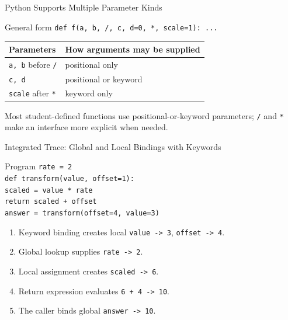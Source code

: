 \documentclass[aspectratio=169,10pt]{beamer}
\begin{document}
\begin{frame}{Python Supports Multiple Parameter Kinds}
  \begin{block}{General form}
    \centering
    \texttt{def f(a, b, /, c, d=0, *, scale=1): ...}
  \end{block}

  \begin{center}
    \renewcommand{\arraystretch}{1.25}
    \begin{tabular}{l|l}
      \textbf{Parameters} & \textbf{How arguments may be supplied} \\\hline
      \texttt{a, b} before \texttt{/} & positional only \\
      \texttt{c, d} & positional or keyword \\
      \texttt{scale} after \texttt{*} & keyword only
    \end{tabular}
  \end{center}

  \begin{keyidea}
    Most student-defined functions use positional-or-keyword parameters; \texttt{/} and \texttt{*} make an interface more explicit when needed.
  \end{keyidea}
\end{frame}


\begin{frame}{Integrated Trace: Global and Local Bindings with Keywords}
  \begin{block}{Program}
    \texttt{rate = 2}\\
    \texttt{def transform(value, offset=1):}\\
    \hspace*{0.20in}\texttt{scaled = value * rate}\\
    \hspace*{0.20in}\texttt{return scaled + offset}\\[0.08in]
    \texttt{answer = transform(offset=4, value=3)}
  \end{block}

  \begin{enumerate}
    \item Keyword binding creates local \texttt{value -> 3}, \texttt{offset -> 4}.
    \item Global lookup supplies \texttt{rate -> 2}.
    \item Local assignment creates \texttt{scaled -> 6}.
    \item Return expression evaluates \texttt{6 + 4 -> 10}.
    \item The caller binds global \texttt{answer -> 10}.
  \end{enumerate}
\end{frame}
\end{document}

